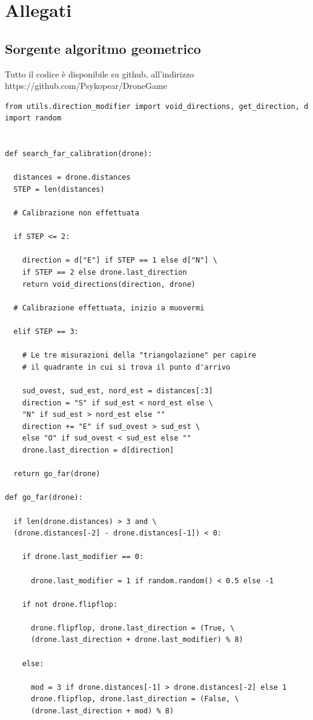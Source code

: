 \chapter{Allegati}
\section{Sorgente algoritmo geometrico}
Tutto il codice è disponibile su github, all'indirizzo https://github.com/Psykopear/DroneGame
\begin{verbatim}
from utils.direction_modifier import void_directions, get_direction, d
import random


def search_far_calibration(drone):

  distances = drone.distances
  STEP = len(distances)

  # Calibrazione non effettuata

  if STEP <= 2:

    direction = d["E"] if STEP == 1 else d["N"] \
    if STEP == 2 else drone.last_direction
    return void_directions(direction, drone)

  # Calibrazione effettuata, inizio a muovermi

  elif STEP == 3:

    # Le tre misurazioni della "triangolazione" per capire
    # il quadrante in cui si trova il punto d'arrivo

    sud_ovest, sud_est, nord_est = distances[:3]
    direction = "S" if sud_est < nord_est else \
    "N" if sud_est > nord_est else ""
    direction += "E" if sud_ovest > sud_est \
    else "O" if sud_ovest < sud_est else ""
    drone.last_direction = d[direction]

  return go_far(drone) 

def go_far(drone):

  if len(drone.distances) > 3 and \
  (drone.distances[-2] - drone.distances[-1]) < 0:

    if drone.last_modifier == 0:

      drone.last_modifier = 1 if random.random() < 0.5 else -1

    if not drone.flipflop:

      drone.flipflop, drone.last_direction = (True, \
      (drone.last_direction + drone.last_modifier) % 8)

    else:

      mod = 3 if drone.distances[-1] > drone.distances[-2] else 1
      drone.flipflop, drone.last_direction = (False, \
      (drone.last_direction + mod) % 8)


\end{verbatim}
